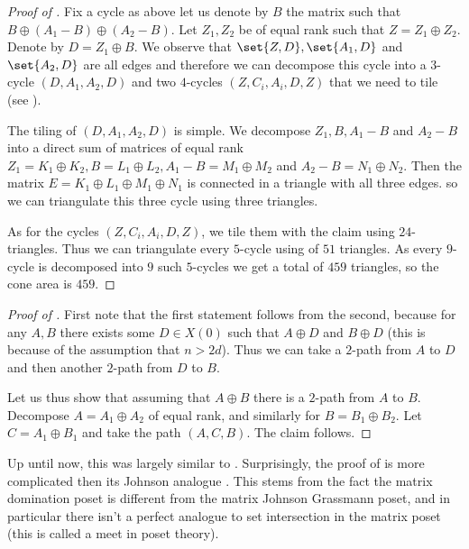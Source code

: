 \begin{proof}[Proof of ]
    Fix a cycle as above let us denote by \(B\) the matrix such that \(B \oplus (A_1-B) \oplus (A_2-B)\). Let \(Z_1,Z_2\) be of equal rank such that \(Z = Z_1 \oplus Z_2\). Denote by \(D = Z_1 \oplus B\). We observe that \(\set{Z,D},\set{A_1,D}\) and \(\set{A_2,D}\) are all edges and therefore we can decompose this cycle into a \(3\)-cycle \((D,A_1,A_2,D)\) and two \(4\)-cycles \((Z,C_i,A_i,D,Z)\) that we need to tile (see ).

    The tiling of \((D,A_1,A_2,D)\) is simple. We decompose \(Z_1,B,A_1-B\) and \(A_2-B\) into a direct sum of matrices of equal rank \(Z_1=K_1 \oplus K_2, B=L_1\oplus L_2, A_1-B=M_1 \oplus M_2\) and \(A_2-B=N_1 \oplus N_2\). Then the matrix \(E = K_1\oplus L_1 \oplus M_1 \oplus N_1\) is connected in a triangle with all three edges. so we can triangulate this three cycle using three triangles.

    As for the cycles \((Z,C_i,A_i,D,Z)\), we tile them with the claim  using \(24\)-triangles. Thus we can triangulate every \(5\)-cycle using of \(51\) triangles. As every \(9\)-cycle is decomposed into \(9\) such \(5\)-cycles we get a total of \(459\) triangles, so the cone area is \(459\).
\end{proof}

\begin{proof}[Proof of ]
    First note that the first statement follows from the second, because for any \(A,B\) there exists some \(D \in X(0)\) such that \(A \oplus D\) and \(B \oplus D\) (this is because of the assumption that \(n > 2d\)). Thus we can take a \(2\)-path from \(A\) to \(D\) and then another \(2\)-path from \(D\) to \(B\). 
    
    Let us thus show that assuming that \(A \oplus B\) there is a \(2\)-path from \(A\) to \(B\). Decompose \(A=A_1\oplus A_2\) of equal rank, and similarly for \(B=B_1 \oplus B_2\). Let \(C=A_1\oplus B_1\) and take the path \((A,C,B)\). The claim follows.
\end{proof}

Up until now, this was largely similar to . Surprisingly, the proof of  is more complicated then its Johnson analogue . This stems from the fact the matrix domination poset is different from the matrix Johnson Grassmann poset, and in particular there isn't a perfect analogue to set intersection in the matrix poset (this is called a meet in poset theory).


